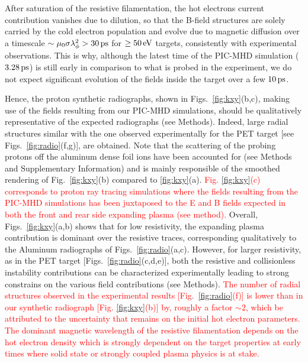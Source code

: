 \documentclass[aps,twocolumn,showpacs,superscriptaddress]{revtex4}
\begin{document}
After saturation of  the resistive filamentation, the hot electrons current contribution vanishes due to dilution, so that the B-field structures are solely carried by the cold electron population and evolve due to magnetic diffusion  over a  timescale $\sim \mu_0 \sigma \lambda_\phi^2 > 30\,\rm ps$ for $ \ge 50\,\rm eV$ targets, consistently with experimental observations. This is why, although the latest time of the PIC-MHD simulation ($3.28\,\rm ps$) is still early in comparison to what is probed in the experiment,  we do not expect significant evolution of the fields inside the target over a few $10\,\rm ps$.

Hence, the proton synthetic radiographs, shown in Figs.~\ref{fig:kxy}(b,c), making use of the fields resulting from our PIC-MHD simulations, should be qualitatively representative of the expected radiographs (see Methods). Indeed,  large radial structures similar with the one observed experimentally for the PET target [see Figs.~\ref{fig:radio}(f,g)],  are obtained. Note that the scattering of the probing protons off the aluminum dense foil ions have been accounted for (see Methods and Supplementary Information) and is mainly responsible of the smoothed rendering of Fig.~\ref{fig:kxy}(b) compared to \ref{fig:kxy}(a).
 \textcolor{red}{
Fig. \ref{fig:kxy}(c) corresponds to proton ray tracing simulations where the fields resulting from the PIC-MHD simulations has been juxtaposed to the E and B fields expected in both the front and rear side expanding plasma (see method). 
}
Overall, Figs.~\ref{fig:kxy}(a,b) shows that for low resistivity, the expanding plasma contribution is dominant over the resistive traces, corresponding qualitatively to the Aluminum radiographs of Figs.~\ref{fig:radio}(a,c). However, for larger resistivity, as in the PET target [Figs.~\ref{fig:radio}(c,d,e)], both the resistive and collisionless instability  contributions can be characterized experimentally  leading to strong constrains on the various field contributions (see Methods).
\textcolor{red}{
The number of radial structures observed in the experimental results [Fig.~\ref{fig:radio}(f)] is lower than in    our synthetic radiograph [Fig. \ref{fig:kxy}(b)] by, roughly a factor $\sim 2$, which  be attributed to the uncertainty that remains on the initial hot electron parameters. The dominant magnetic wavelength of the resistive filamentation depends on the hot electron density which is   strongly dependent on the target properties at  early times where   solid state or strongly coupled plasma physics is at stake. 
 }
 
\end{document}
